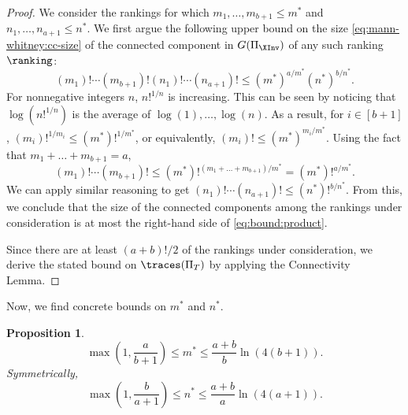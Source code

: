 \documentclass[11pt]{article}
\numberwithin{equation}{section}
\newtheorem{proposition}[theorem]{Proposition}
\theoremstyle{definition}
\theoremstyle{plain}
\begin{document}
\begin{proof}
We consider the rankings for which $m_1,\dots,m_{b+1}\le m^*$ and $n_1,\dots,n_{a+1}\le n^*$. We first argue the following upper bound on the size \eqref{eq:mann-whitney:cc-size} of the connected component in $G(\Pi_{\XInv})$ of any such ranking $\ranking$:
     \begin{equation}\label{eq:bound:product}
        (m_1)!\cdots (m_{b+1})!(n_1)!\cdots (n_{a+1})! \le (m^*)^{a/m^*}(n^*)^{b/n^*}.
    \end{equation}
For nonnegative integers $n$, $n!^{1/n}$ is increasing. This can be seen by noticing that $\log(n!^{1/n})$ is the average of $\log(1),\dots,\log(n)$. As a result, for $i \in [b+1]$, $(m_i)!^{1/m_i}\le (m^*)!^{1/m^*}$, or equivalently, $(m_i)!\le (m^*)^{m_i/m^*}$. Using the fact that $m_1+\dots +m_{b+1}=a$,
    \begin{equation*}
        (m_1)!\cdots (m_{b+1})!\le (m^*)!^{(m_1+\dots+m_{b+1})/m^*}=(m^*)!^{a/m^*}.
    \end{equation*}
We can apply similar reasoning to get $(n_1)!\cdots (n_{a+1})!\le (n^*)!^{b/n^*}$. From this, we conclude that the size of the connected components among the rankings under consideration is at most the right-hand side of \eqref{eq:bound:product}. 
    
Since there are at least $(a+b)!/2$ of the rankings under consideration, we derive the stated bound on $\traces(\Pi_T)$ by applying the Connectivity Lemma.
\end{proof}

Now, we find concrete bounds on $m^*$ and $n^*$.

\begin{proposition}
    \label{prop:mann-whitney:chunk-size}
    \[\max\left(1,\frac{a}{b+1}\right)\le m^* \le \frac{a+b}{b}\ln(4(b+1)). \]
    Symmetrically,
    \[\max\left(1,\frac{b}{a+1}\right)\le n^* \le \frac{a+b}{a}\ln(4(a+1)). \]
\end{proposition}
\end{document}
